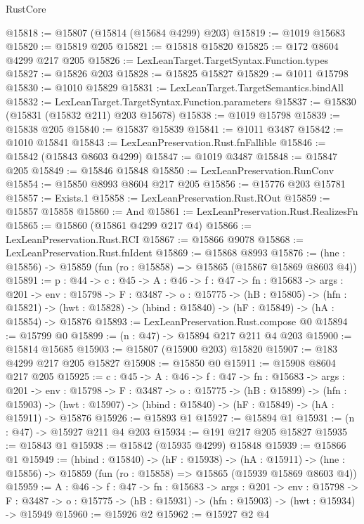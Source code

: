 \begin{lexlean}{RustCore}
\begin{coremodule}
@15818 := @15807 (@15814 (@15684 @4299) @203)
@15819 := @1019 @15683
@15820 := @15819 @205
@15821 := @15818 @15820
@15825 := @172 @8604 @4299 @217 @205
@15826 := LexLeanTarget.TargetSyntax.Function.types
@15827 := @15826 @203
@15828 := @15825 @15827
@15829 := @1011 @15798
@15830 := @1010 @15829
@15831 := LexLeanTarget.TargetSemantics.bindAll
@15832 := LexLeanTarget.TargetSyntax.Function.parameters
@15837 := @15830 (@15831 (@15832 @211) @203 @15678)
@15838 := @1019 @15798
@15839 := @15838 @205
@15840 := @15837 @15839
@15841 := @1011 @3487
@15842 := @1010 @15841
@15843 := LexLeanPreservation.Rust.fnFallible
@15846 := @15842 (@15843 @8603 @4299)
@15847 := @1019 @3487
@15848 := @15847 @205
@15849 := @15846 @15848
@15850 := LexLeanPreservation.RunConv
@15854 := @15850 @8993 @8604 @217 @205
@15856 := @15776 @203 @15781
@15857 := Exists.{1}
@15858 := LexLeanPreservation.Rust.ROut
@15859 := @15857 @15858
@15860 := And
@15861 := LexLeanPreservation.Rust.RealizesFn
@15865 := @15860 (@15861 @4299 @217 @4)
@15866 := LexLeanPreservation.Rust.RCI
@15867 := @15866 @9078
@15868 := LexLeanPreservation.Rust.fnIdent
@15869 := @15868 @8993
@15876 := (hne : @15856) -> @15859 (fun (ro : @15858) => @15865 (@15867 @15869 @8603 @4))
@15891 := {p : @44} ->
  {c : @45} ->
  {A : @46} ->
  {f : @47} ->
  {fn : @15683} ->
  {args : @201} ->
  {env : @15798} ->
  {F : @3487} ->
  {o : @15775} ->
  (hB : @15805) ->
  (hfn : @15821) -> (hwt : @15828) -> (hbind : @15840) -> (hF : @15849) -> (hA : @15854) -> @15876
@15893 := LexLeanPreservation.Rust.compose @0
@15894 := @15799 @0
@15899 := (n : @47) -> @15894 @217 @211 @4 @203
@15900 := @15814 @15685
@15903 := @15807 (@15900 @203) @15820
@15907 := @183 @4299 @217 @205 @15827
@15908 := @15850 @0
@15911 := @15908 @8604 @217 @205
@15925 := {c : @45} ->
  {A : @46} ->
  {f : @47} ->
  {fn : @15683} ->
  {args : @201} ->
  {env : @15798} ->
  {F : @3487} ->
  {o : @15775} ->
  (hB : @15899) ->
  (hfn : @15903) -> (hwt : @15907) -> (hbind : @15840) -> (hF : @15849) -> (hA : @15911) -> @15876
@15926 := @15893 @1
@15927 := @15894 @1
@15931 := (n : @47) -> @15927 @211 @4 @203
@15934 := @191 @217 @205 @15827
@15935 := @15843 @1
@15938 := @15842 (@15935 @4299) @15848
@15939 := @15866 @1
@15949 := (hbind : @15840) ->
  (hF : @15938) ->
  (hA : @15911) -> (hne : @15856) -> @15859 (fun (ro : @15858) => @15865 (@15939 @15869 @8603 @4))
@15959 := {A : @46} ->
  {f : @47} ->
  {fn : @15683} ->
  {args : @201} ->
  {env : @15798} ->
  {F : @3487} -> {o : @15775} -> (hB : @15931) -> (hfn : @15903) -> (hwt : @15934) -> @15949
@15960 := @15926 @2
@15962 := @15927 @2 @4

\end{coremodule}
\end{lexlean}
